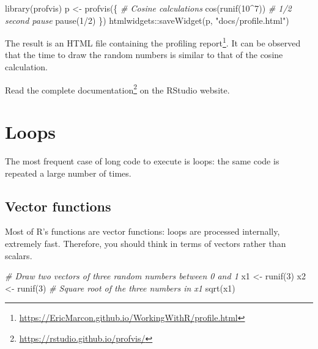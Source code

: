\documentclass[
  12pt,
  american,
  a4paper,
  extrafontsizes,onecolumn,openright
  ]{memoir}
\newenvironment{Shaded}{\begin{snugshade}}{\end{snugshade}}
\newcommand{\CommentTok}[1]{\textcolor[rgb]{0.56,0.35,0.01}{\textit{#1}}}
\newcommand{\DecValTok}[1]{\textcolor[rgb]{0.00,0.00,0.81}{#1}}
\newcommand{\FunctionTok}[1]{\textcolor[rgb]{0.00,0.00,0.00}{#1}}
\newcommand{\NormalTok}[1]{#1}
\newcommand{\OtherTok}[1]{\textcolor[rgb]{0.56,0.35,0.01}{#1}}
\newcommand{\SpecialCharTok}[1]{\textcolor[rgb]{0.00,0.00,0.00}{#1}}
\newcommand{\StringTok}[1]{\textcolor[rgb]{0.31,0.60,0.02}{#1}}
\begin{document}
\begin{Shaded}
\begin{Highlighting}[]
\FunctionTok{library}\NormalTok{(profvis)}
\NormalTok{p }\OtherTok{\textless{}{-}} \FunctionTok{profvis}\NormalTok{(\{}
    \CommentTok{\# Cosine calculations}
    \FunctionTok{cos}\NormalTok{(}\FunctionTok{runif}\NormalTok{(}\DecValTok{10}\SpecialCharTok{\^{}}\DecValTok{7}\NormalTok{))}
    \CommentTok{\# 1/2 second pause}
    \FunctionTok{pause}\NormalTok{(}\DecValTok{1}\SpecialCharTok{/}\DecValTok{2}\NormalTok{)}
\NormalTok{\})}
\NormalTok{htmlwidgets}\SpecialCharTok{::}\FunctionTok{saveWidget}\NormalTok{(p, }\StringTok{"docs/profile.html"}\NormalTok{)}
\end{Highlighting}
\end{Shaded}

\normalsize

The result is an HTML file containing the profiling report\footnote{\url{https://EricMarcon.github.io/WorkingWithR/profile.html}}.
It can be observed that the time to draw the random numbers is similar to that of the cosine calculation.

Read the complete documentation\footnote{\url{https://rstudio.github.io/profvis/}} on the RStudio website.

\hypertarget{loops}{%
\section{Loops}\label{loops}}

The most frequent case of long code to execute is loops: the same code is repeated a large number of times.

\hypertarget{vector-functions}{%
\subsection{Vector functions}\label{vector-functions}}

Most of R's functions are vector functions: loops are processed internally, extremely fast.
Therefore, you should think in terms of vectors rather than scalars.

\scriptsize

\begin{Shaded}
\begin{Highlighting}[]
\CommentTok{\# Draw two vectors of three random numbers between 0 and 1}
\NormalTok{x1 }\OtherTok{\textless{}{-}} \FunctionTok{runif}\NormalTok{(}\DecValTok{3}\NormalTok{)}
\NormalTok{x2 }\OtherTok{\textless{}{-}} \FunctionTok{runif}\NormalTok{(}\DecValTok{3}\NormalTok{)}
\CommentTok{\# Square root of the three numbers in x1}
\FunctionTok{sqrt}\NormalTok{(x1)}
\end{Highlighting}
\end{Shaded}
\end{document}

